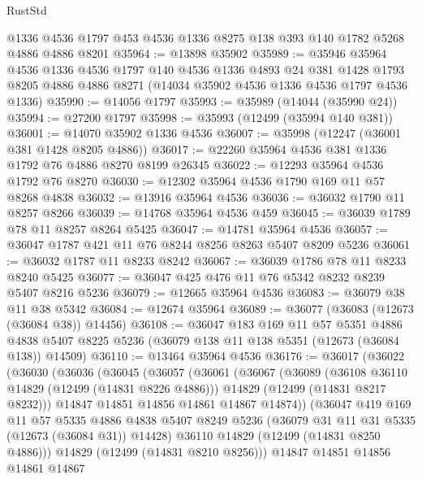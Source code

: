 \begin{lexlean}{RustStd}
\begin{coremodule}
{\begin{coremodule}
{{{{{{{{{{{{{{{{{{{{{{{{{{{{{{{{{{{{{{{{{{{{{{{{{{{{{{{{{{{{{{{{{{{{{{{{{{{{{{{{    @1336
    @4536
    @1797
    @453
    @4536
    @1336
    @8275
    @138
    @393
    @140
    @1782
    @5268
    @4886
    @4886
    @8201
@35964 := @13898 @35902
@35989 := @35946
    @35964
    @4536
    @1336
    @4536
    @1797
    @140
    @4536
    @1336
    @4893
    @24
    @381
    @1428
    @1793
    @8205
    @4886
    @4886
    @8271
    (@14034 @35902 @4536 @1336 @4536 @1797 @4536 @1336)
@35990 := @14056 @1797
@35993 := @35989 (@14044 (@35990 @24))
@35994 := @27200 @1797
@35998 := @35993 (@12499 (@35994 @140 @381))
@36001 := @14070 @35902 @1336 @4536
@36007 := @35998 (@12247 (@36001 @381 @1428 @8205 @4886))
@36017 := @22260 @35964 @4536 @381 @1336 @1792 @76 @4886 @8270 @8199 @26345
@36022 := @12293 @35964 @4536 @1792 @76 @8270
@36030 := @12302 @35964 @4536 @1790 @169 @11 @57 @8268 @4838
@36032 := @13916 @35964 @4536
@36036 := @36032 @1790 @11 @8257 @8266
@36039 := @14768 @35964 @4536 @459
@36045 := @36039 @1789 @78 @11 @8257 @8264 @5425
@36047 := @14781 @35964 @4536
@36057 := @36047 @1787 @421 @11 @76 @8244 @8256 @8263 @5407 @8209 @5236
@36061 := @36032 @1787 @11 @8233 @8242
@36067 := @36039 @1786 @78 @11 @8233 @8240 @5425
@36077 := @36047 @425 @476 @11 @76 @5342 @8232 @8239 @5407 @8216 @5236
@36079 := @12665 @35964 @4536
@36083 := @36079 @38 @11 @38 @5342
@36084 := @12674 @35964
@36089 := @36077 (@36083 (@12673 (@36084 @38)) @14456)
@36108 := @36047
    @183
    @169
    @11
    @57
    @5351
    @4886
    @4838
    @5407
    @8225
    @5236
    (@36079 @138 @11 @138 @5351 (@12673 (@36084 @138)) @14509)
@36110 := @13464 @35964 @4536
@36176 := @36017
    (@36022
      (@36030
        (@36036
          (@36045
            (@36057
              (@36061
                (@36067
                  (@36089
                    (@36108 @36110 @14829 (@12499 (@14831 @8226 @4886)))
                    @14829
                    (@12499 (@14831 @8217 @8232)))
                  @14847
                  @14851
                  @14856
                  @14861
                  @14867
                  @14874))
              (@36047
                @419
                @169
                @11
                @57
                @5335
                @4886
                @4838
                @5407
                @8249
                @5236
                (@36079 @31 @11 @31 @5335 (@12673 (@36084 @31)) @14428)
                @36110
                @14829
                (@12499 (@14831 @8250 @4886)))
              @14829
              (@12499 (@14831 @8210 @8256)))
            @14847
            @14851
            @14856
            @14861
            @14867
}}}}}}}}}}}}}}}}}}}}}}}}}}}}}}}}}}}}}}}}}}}}}}}}}}}}}}}}}}}}}}}}}}}}}}}}}}}}}}}}
\end{coremodule}}
\end{coremodule}
\end{lexlean}
